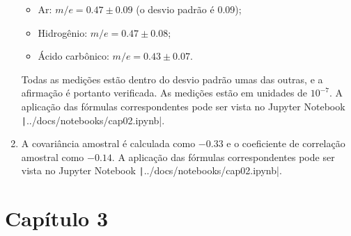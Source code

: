 \begin{enumerate}[label=\textbf{2.\arabic*.}]
	\begin{itemize}
	\item Ar: $m/e = 0.47 \pm 0.09$ (o desvio padrão é 0.09);		
	\item Hidrogênio: $m/e = 0.47 \pm 0.08$;
	\item Ácido carbônico: $m/e = 0.43 \pm 0.07$.
	\end{itemize}	
	
	Todas as medições estão dentro do desvio padrão umas das outras, e a afirmação é portanto verificada. As medições estão em unidades de $10^{-7}$. A aplicação das fórmulas correspondentes pode ser vista no Jupyter Notebook \texttt|../docs/notebooks/cap02.ipynb|.
	
	\item A covariância amostral é calculada como $-0.33$ e o coeficiente de correlação amostral como $-0.14$. A aplicação das fórmulas correspondentes pode ser vista no Jupyter Notebook \texttt|../docs/notebooks/cap02.ipynb|. 
\end{enumerate}

\section*{Capítulo 3}


